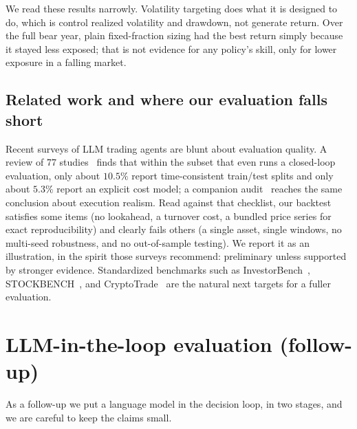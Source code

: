 \documentclass[11pt]{article}
\begin{document}
We read these results narrowly. Volatility targeting does what it is designed to do, which is control
realized volatility and drawdown, not generate return. Over the full bear year, plain fixed-fraction
sizing had the best return simply because it stayed less exposed; that is not evidence for any policy's
skill, only for lower exposure in a falling market.

\subsection{Related work and where our evaluation falls short}
Recent surveys of LLM trading agents are blunt about evaluation quality. A review of 77
studies~\cite{survey} finds that within the subset that even runs a closed-loop evaluation, only about
$10.5\%$ report time-consistent train/test splits and only about $5.3\%$ report an explicit cost
model; a companion audit~\cite{execreview} reaches the same conclusion about execution realism. Read
against that checklist, our backtest satisfies some items (no lookahead, a turnover cost, a bundled
price series for exact reproducibility) and clearly fails others (a single asset, single windows, no
multi-seed robustness, and no out-of-sample testing). We report it as an illustration, in the spirit
those surveys recommend: preliminary unless supported by stronger evidence. Standardized benchmarks
such as InvestorBench~\cite{investorbench}, STOCKBENCH~\cite{stockbench}, and
CryptoTrade~\cite{cryptotrade} are the natural next targets for a fuller evaluation.

\section{LLM-in-the-loop evaluation (follow-up)}\label{sec:llm}
As a follow-up we put a language model in the decision loop, in two stages, and we are careful to keep
the claims small.
\end{document}
